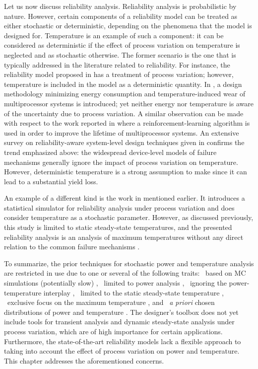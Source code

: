 Let us now discuss reliability analysis. Reliability analysis is probabilistic
by nature. However, certain components of a reliability model can be treated as
either stochastic or deterministic, depending on the phenomena that the model is
designed for. Temperature is an example of such a component: it can be
considered as deterministic if the effect of process variation on temperature is
neglected and as stochastic otherwise. The former scenario is the one that is
typically addressed in the literature related to reliability. For instance, the
reliability model proposed in \cite{xiang2010} has a treatment of process
variation; however, temperature is included in the model as a deterministic
quantity. In \cite{das2014a}, a design methodology minimizing energy consumption
and temperature-induced wear of multiprocessor systems is introduced; yet
neither energy nor temperature is aware of the uncertainty due to process
variation. A similar observation can be made with respect to the work reported
in \cite{das2014c} where a reinforcement-learning algorithm is used in order to
improve the lifetime of multiprocessor systems. An extensive survey on
reliability-aware system-level design techniques given in \cite{das2014b}
confirms the trend emphasized above: the widespread device-level models of
failure mechanisms generally ignore the impact of process variation on
temperature. However, deterministic temperature is a strong assumption to make
since it can lead to a substantial yield loss.

An example of a different kind is the work in \cite{lee2013} mentioned earlier.
It introduces a statistical simulator for reliability analysis under process
variation and does consider temperature as a stochastic parameter. However, as
discussed previously, this study is limited to static steady-state temperatures,
and the presented reliability analysis is an analysis of maximum temperatures
without any direct relation to the common failure mechanisms \cite{jedec2016}.

To summarize, the prior techniques for stochastic power and temperature analysis
are restricted in use due to one or several of the following traits: \one~based
on \ac{MC} simulations (potentially slow) \cite{chandra2010}, \two~limited to
power analysis \cite{bhardwaj2006, ghanta2006, vrudhula2006, bhardwaj2008,
shen2009, chandra2010}, \three~ignoring the power-temperature interplay
\cite{bhardwaj2006, ghanta2006, vrudhula2006, bhardwaj2008, huang2009a,
shen2009}, \four~limited to the static steady-state temperature
\cite{huang2009a, juan2011, juan2012, lee2013}, \five~exclusive focus on the
maximum temperature \cite{juan2011}, and \six~\emph{a priori} chosen
distributions of power and temperature \cite{bhardwaj2006, srivastava2010,
juan2012}. The designer's toolbox does not yet include tools for transient
analysis and dynamic steady-state analysis under process variation, which are of
high importance for certain applications. Furthermore, the state-of-the-art
reliability models lack a flexible approach to taking into account the effect of
process variation on power and temperature. This chapter addresses the
aforementioned concerns.
